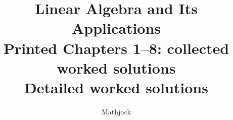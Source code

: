 
\title{\textbf{Linear Algebra and Its Applications}\\[0.3em]Printed Chapters 1--8: collected worked solutions\\[0.3em]\large Detailed worked solutions}
\author{Mathjock}
\date{}

\maketitle
\bookinfo
\tableofcontents
\clearpage
\renewcommand{\thesection}{1.\arabic{section}}
\renewcommand{\theHsection}{1.\arabic{section}}
\setcounter{section}{0}

\clearpage
\renewcommand{\thesection}{1.\arabic{section}}
\renewcommand{\theHsection}{1.\arabic{section}}
\setcounter{section}{1}

\clearpage
\renewcommand{\thesection}{1.\arabic{section}}
\renewcommand{\theHsection}{1.\arabic{section}}
\setcounter{section}{2}

\clearpage
\renewcommand{\thesection}{1.\arabic{section}}
\renewcommand{\theHsection}{1.\arabic{section}}
\setcounter{section}{3}

\clearpage
\renewcommand{\thesection}{1.\arabic{section}}
\renewcommand{\theHsection}{1.\arabic{section}}
\setcounter{section}{4}

\clearpage
\renewcommand{\thesection}{1.\arabic{section}}
\renewcommand{\theHsection}{1.\arabic{section}}
\setcounter{section}{5}

\clearpage
\renewcommand{\thesection}{1.\arabic{section}}
\renewcommand{\theHsection}{1.\arabic{section}}
\setcounter{section}{6}

\clearpage
\renewcommand{\thesection}{1.\arabic{section}}
\renewcommand{\theHsection}{1.\arabic{section}}
\setcounter{section}{7}

\clearpage
\renewcommand{\thesection}{1.\arabic{section}}
\renewcommand{\theHsection}{1.\arabic{section}}
\setcounter{section}{8}

\clearpage
\renewcommand{\thesection}{1.\arabic{section}}
\renewcommand{\theHsection}{1.\arabic{section}}
\setcounter{section}{9}

\clearpage
\renewcommand{\thesection}{1.S}
\renewcommand{\theHsection}{1.S}
\setcounter{section}{0}

\clearpage
\renewcommand{\thesection}{2.\arabic{section}}
\renewcommand{\theHsection}{2.\arabic{section}}
\setcounter{section}{0}

\clearpage
\renewcommand{\thesection}{2.\arabic{section}}
\renewcommand{\theHsection}{2.\arabic{section}}
\setcounter{section}{1}
